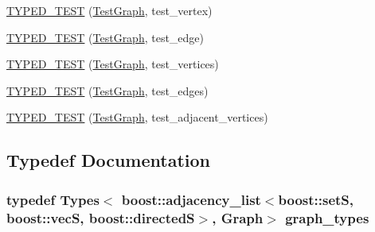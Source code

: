 \begin{DoxyCompactItemize}
\item 
\hyperlink{TestGraph_8c_09_09_af3fff20b93f0116c698ff44507e76aa4}{T\-Y\-P\-E\-D\-\_\-\-T\-E\-S\-T} (\hyperlink{structTestGraph}{Test\-Graph}, test\-\_\-vertex)
\item 
\hyperlink{TestGraph_8c_09_09_a7a4ea6096b423811f225adb93948090c}{T\-Y\-P\-E\-D\-\_\-\-T\-E\-S\-T} (\hyperlink{structTestGraph}{Test\-Graph}, test\-\_\-edge)
\item 
\hyperlink{TestGraph_8c_09_09_a58a54238d1d9489afe62d6b3df215a2b}{T\-Y\-P\-E\-D\-\_\-\-T\-E\-S\-T} (\hyperlink{structTestGraph}{Test\-Graph}, test\-\_\-vertices)
\item 
\hyperlink{TestGraph_8c_09_09_a09a476a6046ae05f7120b420f6580b8a}{T\-Y\-P\-E\-D\-\_\-\-T\-E\-S\-T} (\hyperlink{structTestGraph}{Test\-Graph}, test\-\_\-edges)
\item 
\hyperlink{TestGraph_8c_09_09_a43218a1cef01d97a1961e19a18013334}{T\-Y\-P\-E\-D\-\_\-\-T\-E\-S\-T} (\hyperlink{structTestGraph}{Test\-Graph}, test\-\_\-adjacent\-\_\-vertices)
\end{DoxyCompactItemize}


\subsection{Typedef Documentation}
\hypertarget{TestGraph_8c_09_09_ab8e2ae2a7026aca598606c55b1494184}{
\subsubsection[{graph\-\_\-types}]{\setlength{\rightskip}{0pt plus 5cm}typedef Types$<$ boost\-::adjacency\-\_\-list$<$boost\-::set\-S, boost\-::vec\-S, boost\-::directed\-S$>$, {\bf Graph}$>$ {\bf graph\-\_\-types}}}\label{TestGraph_8c_09_09_ab8e2ae2a7026aca598606c55b1494184}


